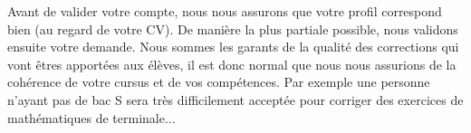 ﻿Avant de valider votre compte, nous nous assurons que votre profil correspond bien (au regard de votre CV). De manière la plus partiale possible, nous validons ensuite votre demande. Nous sommes les garants de la qualité des corrections qui vont êtres apportées aux élèves, il est donc normal que nous nous assurions de la cohérence de votre cursus et de vos compétences. Par exemple une personne n'ayant pas de bac S sera très difficilement acceptée pour corriger des exercices de mathématiques de terminale...